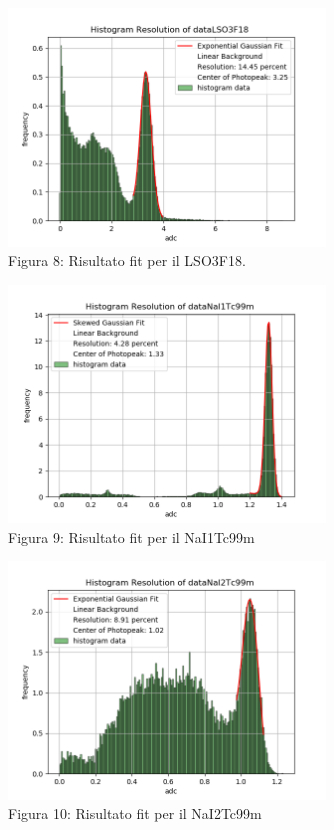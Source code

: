 \documentclass[a4paper]{article}
\begin{document}
\begin{figure}[H]
\centering
\includegraphics[width=0.75\textwidth]{histdataLSO3F18}
\caption{Figura 8: Risultato fit per il LSO3F18.}
\end{figure}
\begin{figure}[H]
\centering
\includegraphics[width=0.75\textwidth]{histdataNaI1Tc99m}
\caption{Figura 9: Risultato fit per il NaI1Tc99m}
\end{figure}
\begin{figure}[H]
\centering
\includegraphics[width=0.75\textwidth]{histdataNaI2Tc99m}
\caption{Figura 10: Risultato fit per il NaI2Tc99m}
\end{figure}
\end{document}
